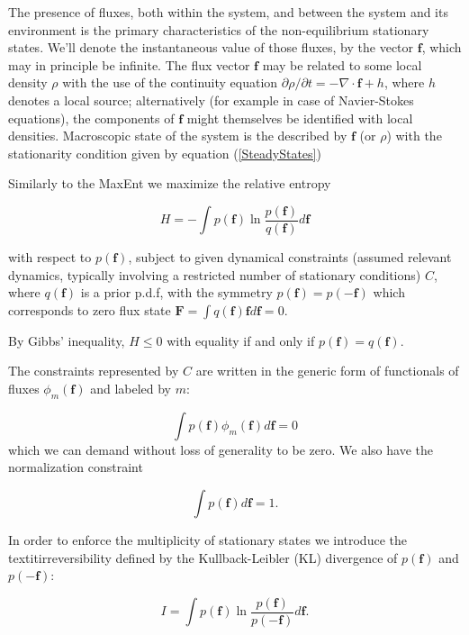 \documentclass[a4paper,12pt]{article}
\begin{document}
The presence of fluxes, both within the system, and between the system and its environment is the primary characteristics of the non-equilibrium stationary states. We'll denote the instantaneous value of those fluxes, by the vector $\bm{f}$, which may in principle be infinite. The flux vector $\bm{f}$ may be related to some local density $\rho$ with the use of the continuity equation $\partial \rho / \partial t =  - \nabla \cdot \bm{f} + h$, where $h$ denotes a local source; alternatively (for example in case of Navier-Stokes equations), the components of $\bm{f}$ might themselves be identified with local densities. Macroscopic state of the system is the described by $\bm{f}$ (or $\rho$) with the stationarity condition given by equation (\ref{SteadyStates})

Similarly to the MaxEnt we maximize the relative entropy

\begin{equation}
  H = - \int p(\bm{f})\ln \frac{p(\bm{f})}{q(\bm{f})} d\bm{f}
\end{equation}

with respect to $p(\bm{f})$, subject to given dynamical constraints (assumed relevant dynamics, typically involving a restricted number of stationary conditions) $C$, where $q(\bm{f})$ is a prior p.d.f, with the symmetry $p(\bm{f}) =p(\bm{-f})$ which corresponds to zero flux state $\bm{F}= \int q(\bm{f}) \bm{f} d\bm{f}=0 $.

By Gibbs' inequality, $H \leq 0$ with equality if and only if $p(\bm{f})=q(\bm{f})$.


The constraints represented by $C$ are written in the generic form of functionals of fluxes $\phi_m(\bm{f})$ and labeled by $m$:

\begin{equation}
\label{Constrain1MEP}
  \int p(\bm{f})\phi_m(\bm{f})d\bm{f} =0
\end{equation}
which we can demand without loss of generality to be zero.
We also have the normalization constraint

\begin{equation}
\label{Constrain2MEP}
  \int p(\bm{f})d\bm{f} = 1.
\end{equation}

In order to enforce the multiplicity of stationary states we introduce the textit{irreversibility} defined by the Kullback-Leibler (KL) divergence of $p(\bm{f})$ and $p(-\bm{f})$:

\begin{equation}
  I= \int p(\bm{f}) \ln \frac{p(\bm{f})}{p(-\bm{f})} d\bm{f}.
\end{equation}
\end{document}
